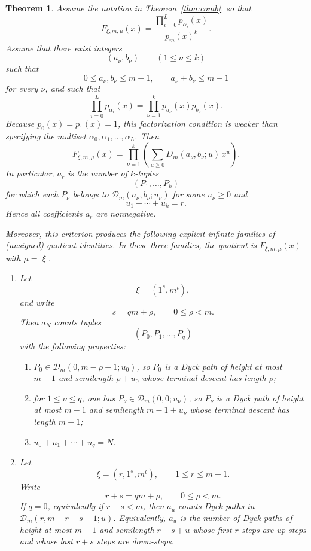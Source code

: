 \documentclass[12pt]{amsart}
\newtheorem{theorem}{Theorem}
\theoremstyle{definition}
\theoremstyle{remark}
\begin{document}
\begin{theorem}
\label{thm:manifest}
Assume the notation in Theorem~\ref{thm:comb}, so that
\[
F_{\xi,m,\mu}(x)=\frac{\prod_{i=0}^L p_{\alpha_i}(x)}{p_m(x)^k}.
\]
Assume that there exist integers
\[
(a_\nu,b_\nu)\qquad (1\le \nu\le k)
\]
such that
\[
0\le a_\nu,b_\nu\le m-1,\qquad a_\nu+b_\nu\le m-1
\]
for every $\nu$, and such that
\[
\prod_{i=0}^L p_{\alpha_i}(x)=\prod_{\nu=1}^k p_{a_\nu}(x)p_{b_\nu}(x).
\]
Because $p_0(x)=p_1(x)=1$, this factorization condition is weaker than specifying the multiset
$\alpha_0,\alpha_1,\dots,\alpha_L$.
Then
\[
F_{\xi,m,\mu}(x)=\prod_{\nu=1}^k\left(\sum_{u\ge 0} D_m(a_\nu,b_\nu;u)\,x^u\right).
\]
In particular, $a_r$ is the number of $k$-tuples
\[
(P_1,\dots,P_k)
\]
for which each $P_\nu$ belongs to $\mathcal D_m(a_\nu,b_\nu;u_\nu)$ for some $u_\nu\ge 0$ and
\[
u_1+\cdots+u_k=r.
\]
Hence all coefficients $a_r$ are nonnegative.

\smallskip
\noindent
Moreover, this criterion produces the following explicit infinite families of (unsigned) quotient identities. In these three families, the quotient is $F_{\xi,m,\mu}(x)$ with $\mu=|\xi|$.
\begin{enumerate}
\item[\textup{(a)}] Let
\[
\xi=(1^s,m^t),
\]
and write
\[
s=qm+\rho,\qquad 0\le \rho<m.
\]
Then $a_N$ counts tuples
\[
(P_0,P_1,\dots,P_q)
\]
with the following properties:
\begin{enumerate}[label=\textup{(\roman*)}]
\item $P_0\in \mathcal D_m(0,m-\rho-1;u_0)$, so $P_0$ is a Dyck path of height at most $m-1$
      and semilength $\rho+u_0$ whose terminal descent has length $\rho$;
\item for $1\le \nu\le q$, one has $P_\nu\in \mathcal D_m(0,0;u_\nu)$, so $P_\nu$ is a Dyck
      path of height at most $m-1$ and semilength $m-1+u_\nu$ whose terminal descent has length
      $m-1$;
\item $u_0+u_1+\cdots+u_q=N$.
\end{enumerate}

\item[\textup{(b)}] Let
\[
\xi=(r,1^s,m^t),
\qquad 1\le r\le m-1.
\]
Write
\[
r+s=qm+\rho,\qquad 0\le \rho<m.
\]
If $q=0$, equivalently if $r+s<m$, then $a_u$ counts Dyck paths in
$\mathcal D_m(r,m-r-s-1;u)$. Equivalently, $a_u$ is the number of Dyck paths of height at most
$m-1$ and semilength $r+s+u$ whose first $r$ steps are up-steps and whose last $r+s$ steps are
down-steps.


\end{enumerate}
\end{theorem}
\end{document}
